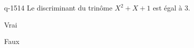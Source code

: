 \begin{truefalse}{q-1514}
Le discriminant du trinôme $X^2+X+1$ est égal à $3$.
\item Vrai
\item* Faux
\end{truefalse}

